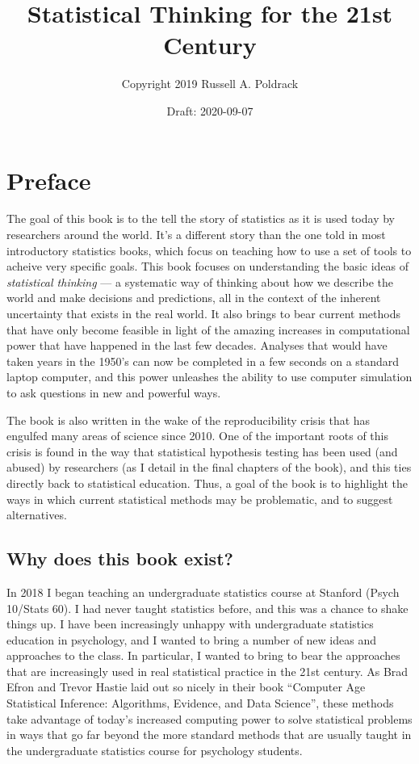 \documentclass[12pt,]{book}
\title{Statistical Thinking for the 21st Century}
\author{Copyright 2019 Russell A. Poldrack}
\date{Draft: 2020-09-07}
\theoremstyle{definition}
\theoremstyle{definition}
\theoremstyle{definition}
\theoremstyle{remark}
\begin{document}
\maketitle

{
\setcounter{tocdepth}{1}
\tableofcontents
}
\hypertarget{preface}{%
\chapter*{Preface}\label{preface}}

The goal of this book is to the tell the story of statistics as it is used today by researchers around the world. It's a different story than the one told in most introductory statistics books, which focus on teaching how to use a set of tools to acheive very specific goals. This book focuses on understanding the basic ideas of \emph{statistical thinking} --- a systematic way of thinking about how we describe the world and make decisions and predictions, all in the context of the inherent uncertainty that exists in the real world. It also brings to bear current methods that have only become feasible in light of the amazing increases in computational power that have happened in the last few decades. Analyses that would have taken years in the 1950's can now be completed in a few seconds on a standard laptop computer, and this power unleashes the ability to use computer simulation to ask questions in new and powerful ways.

The book is also written in the wake of the reproducibility crisis that has engulfed many areas of science since 2010. One of the important roots of this crisis is found in the way that statistical hypothesis testing has been used (and abused) by researchers (as I detail in the final chapters of the book), and this ties directly back to statistical education. Thus, a goal of the book is to highlight the ways in which current statistical methods may be problematic, and to suggest alternatives.

\hypertarget{why-does-this-book-exist}{%
\section{Why does this book exist?}\label{why-does-this-book-exist}}

In 2018 I began teaching an undergraduate statistics course at Stanford (Psych 10/Stats 60). I had never taught statistics before, and this was a chance to shake things up. I have been increasingly unhappy with undergraduate statistics education in psychology, and I wanted to bring a number of new ideas and approaches to the class. In particular, I wanted to bring to bear the approaches that are increasingly used in real statistical practice in the 21st century. As Brad Efron and Trevor Hastie laid out so nicely in their book ``Computer Age Statistical Inference: Algorithms, Evidence, and Data Science'', these methods take advantage of today's increased computing power to solve statistical problems in ways that go far beyond the more standard methods that are usually taught in the undergraduate statistics course for psychology students.
\end{document}
